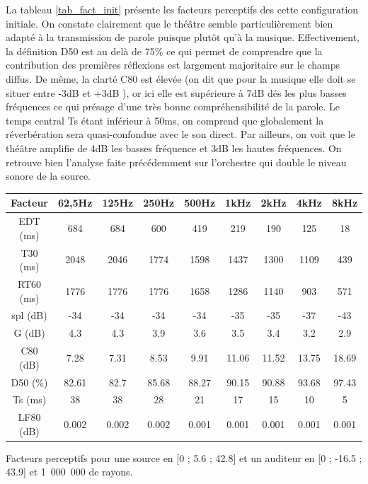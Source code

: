 La tableau \ref{tab_fact_init} présente les facteurs perceptifs des cette configuration initiale. On constate clairement que le théâtre semble particulièrement bien adapté à la transmission de parole puisque plutôt qu'à la musique. Effectivement, la définition \gls{D50} est au delà de 75\% ce qui permet de comprendre que la contribution des premières réflexions est largement majoritaire sur le champs diffus. De même, la clarté \gls{C80} est élevée (on dit que pour la musique elle doit se situer entre -3dB et +3dB \cite[p.59]{acoustique}), or ici elle est supérieure à 7dB dés les plus basses fréquences ce qui présage d'une très bonne compréhensibilité de la parole. Le temps central \gls{Ts} étant inférieur à 50ms, on comprend que globalement la réverbération sera quasi-confondue avec le son direct. Par ailleurs, on voit que le théâtre amplifie de 4dB les basses fréquence et 3dB les hautes fréquences. On retrouve bien l'analyse faite précédemment sur l'orchestre qui double le niveau sonore de la source.
%
\begin{tableth} 
 \begin{tabular}{| *{9}{c|}} 
 \hline 
 Facteur & 62,5Hz & 125Hz & 250Hz & 500Hz & 1kHz & 2kHz & 4kHz & 8kHz \\ 
 \hline 
 \hline 
\gls{EDT} (ms)& 684& 684& 600& 419& 219& 190& 125& 18 \\ 
 \hline 
\gls{T30} (ms)& 2048& 2046& 1774& 1598& 1437& 1300& 1109& 439 \\ 
 \hline 
\gls{RT60} (ms)& 1776& 1776& 1776& 1658& 1286& 1140& 903& 571 \\ 
 \hline 
\gls{spl} (dB)& -34& -34& -34& -34& -35& -35& -37& -43 \\ 
 \hline 
\gls{G} (dB)& 4.3& 4.3& 3.9& 3.6& 3.5& 3.4& 3.2& 2.9 \\
 \hline 
\gls{C80} (dB)& 7.28& 7.31& 8.53& 9.91& 11.06& 11.52& 13.75& 18.69 \\ 
 \hline 
\gls{D50} (\%)& 82.61& 82.7& 85.68& 88.27& 90.15& 90.88& 93.68& 97.43 \\ 
 \hline 
\gls{Ts} (ms)& 38& 38& 28& 21& 17& 15& 10& 5 \\ 
 \hline 
\gls{LF80} (dB)& 0.002& 0.002& 0.002& 0.001& 0.001& 0.001& 0.001& 0.001 \\ 
 \hline 
\end{tabular} 
 \caption{Facteurs perceptifs pour une source en [0 ; 5.6 ; 42.8] et un auditeur en [0 ; -16.5 ; 43.9] et 1~000~000 de rayons.} 
 \label{tab_fact_init} 
 \end{tableth}




